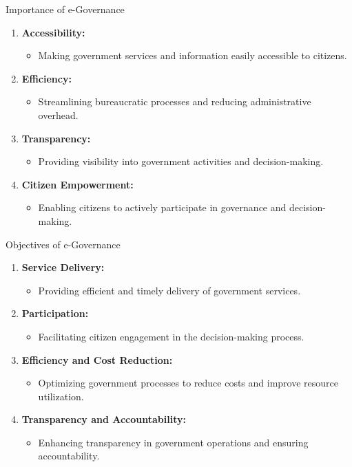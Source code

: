 \begin{frame}{Importance of e-Governance}
  \begin{enumerate}
    \item \textbf{Accessibility:}
      \begin{itemize}
        \item Making government services and information easily accessible to citizens.
      \end{itemize}
    \item \textbf{Efficiency:}
      \begin{itemize}
        \item Streamlining bureaucratic processes and reducing administrative overhead.
      \end{itemize}
    \item \textbf{Transparency:}
      \begin{itemize}
        \item Providing visibility into government activities and decision-making.
      \end{itemize}
    \item \textbf{Citizen Empowerment:}
      \begin{itemize}
        \item Enabling citizens to actively participate in governance and decision-making.
      \end{itemize}
  \end{enumerate}
\end{frame}

\begin{frame}{Objectives of e-Governance}
  \begin{enumerate}
    \item \textbf{Service Delivery:}
      \begin{itemize}
        \item Providing efficient and timely delivery of government services.
      \end{itemize}
    \item \textbf{Participation:}
      \begin{itemize}
        \item Facilitating citizen engagement in the decision-making process.
      \end{itemize}
    \item \textbf{Efficiency and Cost Reduction:}
      \begin{itemize}
        \item Optimizing government processes to reduce costs and improve resource utilization.
      \end{itemize}
    \item \textbf{Transparency and Accountability:}
      \begin{itemize}
        \item Enhancing transparency in government operations and ensuring accountability.
      \end{itemize}
  \end{enumerate}
\end{frame}

